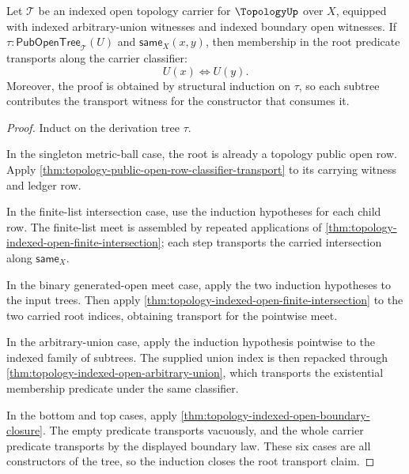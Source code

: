 \begin{theorem}
\label{thm:topology-public-open-derivation-tree-transport}
Let $\mathcal{T}$ be an indexed open topology carrier for $\TopologyUp$ over $X$, equipped with indexed arbitrary-union witnesses and indexed boundary open witnesses. If $\tau:\mathsf{PubOpenTree}_{\mathcal{T}}(U)$ and $\mathsf{same}_X(x,y)$, then membership in the root predicate transports along the carrier classifier:
$$
U(x)\Longleftrightarrow U(y).
$$
Moreover, the proof is obtained by structural induction on $\tau$, so each subtree contributes the transport witness for the constructor that consumes it.
\end{theorem}
\begin{proof}
Induct on the derivation tree $\tau$.

In the singleton metric-ball case, the root is already a topology public open row. Apply \autoref{thm:topology-public-open-row-classifier-transport} to its carrying witness and ledger row.

In the finite-list intersection case, use the induction hypotheses for each child row. The finite-list meet is assembled by repeated applications of \autoref{thm:topology-indexed-open-finite-intersection}; each step transports the carried intersection along $\mathsf{same}_X$.

In the binary generated-open meet case, apply the two induction hypotheses to the input trees. Then apply \autoref{thm:topology-indexed-open-finite-intersection} to the two carried root indices, obtaining transport for the pointwise meet.

In the arbitrary-union case, apply the induction hypothesis pointwise to the indexed family of subtrees. The supplied union index is then repacked through \autoref{thm:topology-indexed-open-arbitrary-union}, which transports the existential membership predicate under the same classifier.

In the bottom and top cases, apply \autoref{thm:topology-indexed-open-boundary-closure}. The empty predicate transports vacuously, and the whole carrier predicate transports by the displayed boundary law. These six cases are all constructors of the tree, so the induction closes the root transport claim.
\end{proof}

